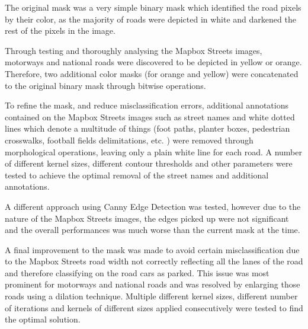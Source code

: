 The original mask was a very simple binary mask which identified the road pixels by their color, as the majority of roads were depicted in white and darkened the rest of the pixels in the image.

Through testing and thoroughly analysing the Mapbox Streets images, motorways and national roads were discovered to be depicted in yellow or orange. Therefore, two additional color masks (for orange and yellow) were concatenated to the original binary mask through bitwise operations.

To refine the mask, and reduce misclassification errors, additional annotations contained on the Mapbox Streets images such as street names and white dotted lines which denote a multitude of things (foot paths, planter boxes, pedestrian crosswalks, football fields delimitations, etc. ) were removed through morphological operations, leaving only a plain white line for each road.
A number of different kernel sizes, different contour thresholds and other parameters were tested to achieve the optimal removal of the street names and additional annotations.

A different approach using Canny Edge Detection was tested, however due to the nature of the Mapbox Streets images, the edges picked up were not significant and the overall performances was much worse than the current mask at the time.

\newpage{}

A final improvement to the mask was made to avoid certain misclassification due
to the Mapbox Streets road width not correctly reflecting all the lanes of the
road and therefore classifying on the road cars as parked. This issue was most
prominent for motorways and national roads and was resolved by enlarging those
roads using a dilation technique. Multiple different kernel sizes, different
number of iterations and kernels of different sizes applied consecutively were
tested to find the optimal solution.

